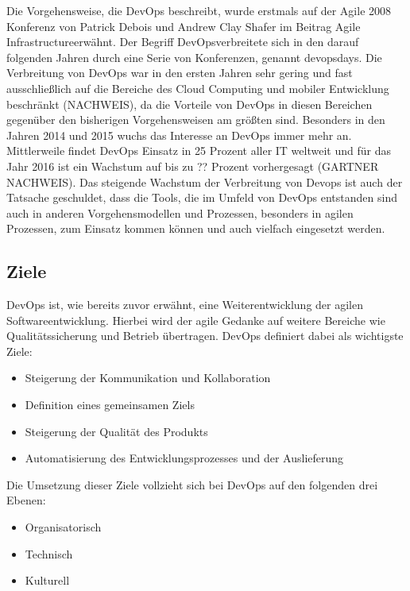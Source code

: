 Die Vorgehensweise, die DevOps beschreibt, wurde erstmals auf der Agile 2008 Konferenz von Patrick Debois und Andrew Clay Shafer im Beitrag \glqq Agile Infrastructure\grqq erwähnt. Der Begriff \glqq DevOps\grqq verbreitete sich in den darauf folgenden Jahren durch eine Serie von Konferenzen, genannt \glqq devopsdays\grqq. Die Verbreitung von DevOps war in den ersten Jahren sehr gering und fast ausschließlich auf die Bereiche des Cloud Computing und mobiler Entwicklung beschränkt (NACHWEIS), da die Vorteile von DevOps in diesen Bereichen gegenüber den bisherigen Vorgehensweisen am größten sind. Besonders in den Jahren 2014 und 2015 wuchs das Interesse an DevOps immer mehr an. Mittlerweile findet DevOps Einsatz in 25 Prozent aller IT weltweit und für das Jahr 2016 ist ein Wachstum auf bis zu ?? Prozent vorhergesagt (GARTNER NACHWEIS). Das steigende Wachstum der Verbreitung von Devops ist auch der Tatsache geschuldet, dass die Tools, die im Umfeld von DevOps entstanden sind auch in anderen Vorgehensmodellen und Prozessen, besonders in agilen Prozessen, zum Einsatz kommen können und auch vielfach eingesetzt werden.

\subsection{Ziele}
DevOps ist, wie bereits zuvor erwähnt, eine Weiterentwicklung der agilen Softwareentwicklung. Hierbei wird der agile Gedanke auf weitere Bereiche wie Qualitätssicherung und Betrieb übertragen. DevOps definiert dabei als wichtigste Ziele:

\begin{itemize}
\item Steigerung der Kommunikation und Kollaboration
\item Definition eines gemeinsamen Ziels
\item Steigerung der Qualität des Produkts
\item Automatisierung des Entwicklungsprozesses und der Auslieferung
\end{itemize}

Die Umsetzung dieser Ziele vollzieht sich bei DevOps auf den folgenden drei Ebenen: 

\begin{itemize}
\item Organisatorisch
\item Technisch
\item Kulturell
\end{itemize}

